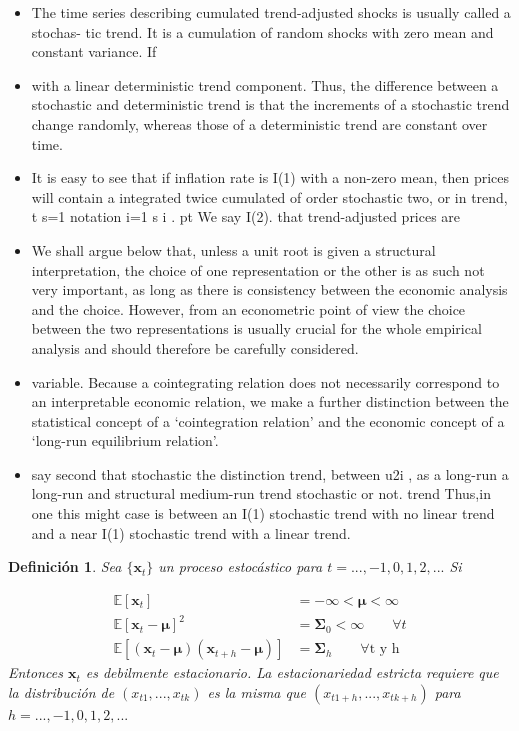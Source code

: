 \documentclass[12pt, twoside]{book}\usepackage[]{graphicx}\usepackage[]{color}
\numberwithin{equation}{section}
\numberwithin{theorem}{section}
\numberwithin{teorema}{section}
\newtheorem{defi}{Definición}
\newenvironment{defin}
      {\begin{shaded}\begin{defi}}
      {\end{defi}\end{shaded}}
\numberwithin{defi}{section}
\numberwithin{prop}{section}
\numberwithin{defi}{section}
\theoremstyle{plain}
\begin{document}
\begin{itemize}
\item The time series describing cumulated trend-adjusted shocks is usually called a stochas-
tic trend. It is a cumulation of random shocks with zero mean and constant variance. If
\item with a linear deterministic trend component. Thus, the difference between a stochastic
and deterministic trend is that the increments of a stochastic trend change randomly,
whereas those of a deterministic trend are constant over time.
\item It is easy to see that if inflation rate is I(1) with a non-zero mean, then prices will contain
a integrated twice cumulated of order stochastic two, or in trend, 
t
 s=1 notation
i=1 s
 i . pt We  say I(2).
 that trend-adjusted prices are
\item We shall argue below that, unless a unit root is given a structural interpretation, the
choice of one representation or the other is as such not very important, as long as there is
consistency between the economic analysis and the choice. However, from an econometric
point of view the choice between the two representations is usually crucial for the whole
empirical analysis and should therefore be carefully considered.
\item variable.
Because a cointegrating relation does not necessarily correspond to an interpretable
economic relation, we make a further distinction between the statistical concept of a
‘cointegration relation’ and the economic concept of a ‘long-run equilibrium relation’.
\item say second that stochastic the distinction trend,
 between 
 u2i , as a long-run a long-run and structural medium-run trend stochastic or not. trend Thus,in one this might
 case
is between an I(1) stochastic trend with no linear trend and a near I(1) stochastic trend
with a linear trend.

\end{itemize}

\begin{defin}
Sea $\{\mathbf{x}_{t}\}$ un proceso estocástico para $t=..., -1,0,1,2,...$ Si 

\begin{align}
\mathbb{E}[\mathbf{x}_{t}] & =-\infty < \mathbf{\mu} <\infty \\ 
\mathbb{E}[\mathbf{x}_{t}-\mathbf{\mu}]^{2} & = \mathbf{\Sigma}_{0}<\infty \qquad \forall t\\ 
\mathbb{E}[(\mathbf{x}_{t}-\mathbf{\mu})(\mathbf{x}_{t+h}-\mathbf{\mu})] & = \mathbf{\Sigma}_{h} \qquad \forall \text{t y h}
\end{align}
Entonces $\mathbf{x}_{t}$ es \textit{debilmente estacionario}. La estacionariedad estricta requiere que la distribución de $(x_{t1},...,x_{tk})$ es la misma que $(x_{t1+h},...,x_{tk+h})$ para $h=...,-1,0,1,2,...$
\end{defin}
\end{document}

